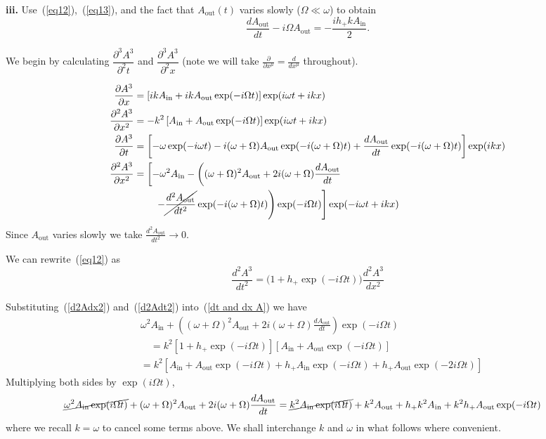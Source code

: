 \documentclass[a4paper]{article} %
\newcommand{\ao}{A_{\text{out}}}
\newcommand{\ai}{A_{\text{in}}}
\begin{document}
\begin{framed}
\textbf{iii.} Use~(\ref{eq12}),~(\ref{eq13}), and the fact that $A_{\text{out}}(t)$ varies slowly ($\Omega \ll \omega$) to obtain
\begin{equation}
\frac{dA_{\text{out}}}{dt} - i\Omega A_{\text{out}} = -\frac{i h_+ k A_{\text{in}}}{2}.\label{eq14}
\end{equation}
\end{framed}

We begin by calculating $\dfrac{\partial^3 A^3}{\partial^2 t}$ and $\dfrac{\partial^3 A^3}{\partial^2 x}$ (note we will take $\frac{\partial}{\partial x^\mu}=\frac{d}{dx^{\mu}}$ throughout).

\begin{align}
\frac{\partial A^3}{\partial x}&=\left[ik\ai + ik\ao \exp(-i\Omega t)\right]\exp(i\omega t + ikx)\\
\frac{\partial^2 A^3}{\partial x^2}&=-k^2\left[\ai+\ao\exp(-i\Omega t)\right]\exp(i\omega t + ikx) \label{d2Adx2}\\
\frac{\partial A^3}{\partial t}&=\left[-\omega\exp(-i\omega t) -i(\omega + \Omega)\ao\exp(-i(\omega+\Omega)t)
+\frac{d\ao}{dt}\exp(-i(\omega+\Omega)t)\right]\exp(ikx) \\
\frac{\partial ^2A^3}{\partial x^2}&=\left[-\omega^2\ai-\left((\omega+\Omega)^2\ao+2i(\omega+\Omega)
\frac{d\ao}{dt}\right.\right.\nonumber\\
&\qquad \left.\left. -\cancel{\frac{d^2\ao}{dt^2}}\exp(-i(\omega+\Omega)t)\right)\exp(-i\Omega t)\right]
\exp(-i\omega t + ikx)\label{d2Adt2}
\end{align}
Since $\ao$ varies slowly we take $\frac{d^2\ao}{dt^2} \to 0$.

We can rewrite~(\ref{eq12}) as
\begin{equation}
\frac{d^2 A^3}{dt^2}=\big(1+h_+\exp(-i \Omega t)\big)\frac{d^2 A^3}{dx^2} \label{dt and dx A}
\end{equation}

Substituting~(\ref{d2Adx2}) and~(\ref{d2Adt2}) into~(\ref{dt and dx A}) we have
\begin{align}
&\omega^2\ai+\left((\omega+\Omega)^2\ao+2i(\omega+\Omega)
\frac{d\ao}{dt}\right)\exp(-i\Omega t)\\
&\quad=k^2\left[1+h_+\exp(-i\Omega t)\right]\left[\ai+\ao\exp(-i\Omega t)\right]\\
&=k^2\left[\ai + \ao\exp(-i\Omega t)+h_+\ai \exp(-i\Omega t)+ h_+\ao \exp(-2i\Omega t)\right]
\end{align}
Multiplying both sides by $\exp(i\Omega t)$,
\begin{align}
\cancel{\omega^2\ai\exp(i\Omega t)}+(\omega + \Omega)^2\ao + 2i(\omega+\Omega)\frac{d\ao}{dt}
&=\cancel{k^2\ai\exp(i\Omega t)}+k^2\ao + h_+ k^2\ai + k^2 h_+\ao \exp(-i\Omega t)
\end{align}
where we recall $k=\omega$ to cancel some terms above. We shall interchange $k$ and $\omega$ in what follows where convenient.
\end{document}
